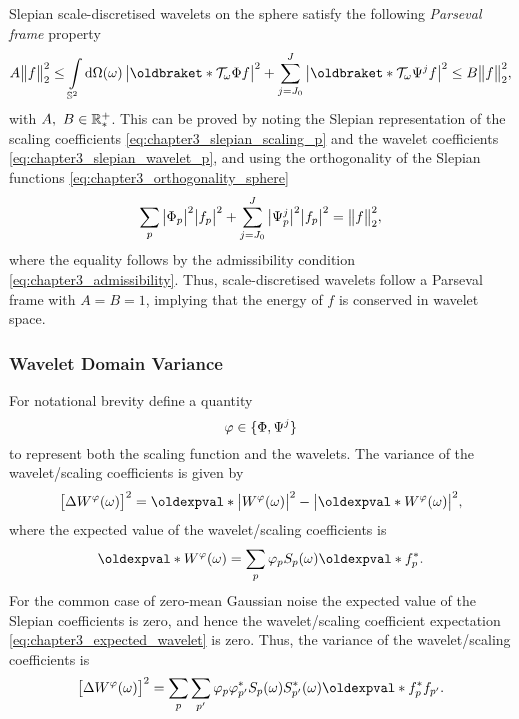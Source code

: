 Slepian scale-discretised wavelets on the sphere satisfy the following \emph{Parseval frame} property
%
\begin{equation}
	A\norm{f}^{2} \leq \integrateSphere{\omega}
	\abs{\braket{\translation{\omega}\Phi}{f}}^{2}
	+ \waveletSum \abs{\braket{\translation{\omega}\Psi^{j}}{f}}^{2}
	\leq B\norm{f}^{2},
\end{equation}
%
with \(A,\ B \in \mathbb{R}_{\ast}^{+}{}\).
This can be proved by noting the Slepian representation of the scaling coefficients \cref{eq:chapter3_slepian_scaling_p} and the wavelet coefficients \cref{eq:chapter3_slepian_wavelet_p}, and using the orthogonality of the Slepian functions \cref{eq:chapter3_orthogonality_sphere}
%
\begin{equation}
	\sum\limits_{p} \big\lvert{\Phi}_{p}\big\rvert^{2} \big\lvert{f}_{p}\big\rvert^{2}
	+ \sum\limits_{j=J_{0}}^{J} \big\lvert{\Psi}_{p}^{j}\big\rvert^{2} \big\lvert{f}_{p}\big\rvert^{2}
	= {\big\lVert f\big\rVert}_{2}^{2},
\end{equation}
%
where the equality follows by the admissibility condition \cref{eq:chapter3_admissibility}.
Thus, scale-discretised wavelets follow a Parseval frame with \(A = B = 1\), implying that the energy of \(f\) is conserved in wavelet space.

\subsubsection{Wavelet Domain Variance}

For notational brevity define a quantity
%
\begin{equation}\label{eq:chapter3_scaling_and_wavelet}
	\varphi \in \{\Phi,\Psi^{j}\}
\end{equation}
%
to represent both the scaling function and the wavelets.
The variance of the wavelet/scaling coefficients is given by
%
\begin{equation}
	\variance{\pixel{W^{\varphi}}}
	= \expval{\abs{\pixel{W^{\varphi}}}^{2}}
	-\abs{\expval{\pixel{W^{\varphi}}}}^{2},
\end{equation}
%
where the expected value of the wavelet/scaling coefficients is
%
\begin{equation}\label{eq:chapter3_expected_wavelet}
	\expval{\pixel{W^{\varphi}}}
	= \slepianSum \slepian{\varphi} \pixel{\slepian{S}} \expval{\conj{\slepian{f}}}.
\end{equation}
%
For the common case of zero-mean Gaussian noise the expected value of the Slepian coefficients is zero, and hence the wavelet/scaling coefficient expectation \cref{eq:chapter3_expected_wavelet} is zero.
Thus, the variance of the wavelet/scaling coefficients is
%
\begin{equation}\label{eq:chapter3_slepian_isotropic_noise}
	\variance{\pixel{W^{\varphi}}}
	= \slepianSum \slepianSum['] \slepian{\varphi} \conj{\slepian[']{\varphi}} \pixel{\slepian{S}} \pixel{\conj{\slepian[']{S}}} \expval{\conj{\slepian{f}} \slepian[']{f}}.
\end{equation}


